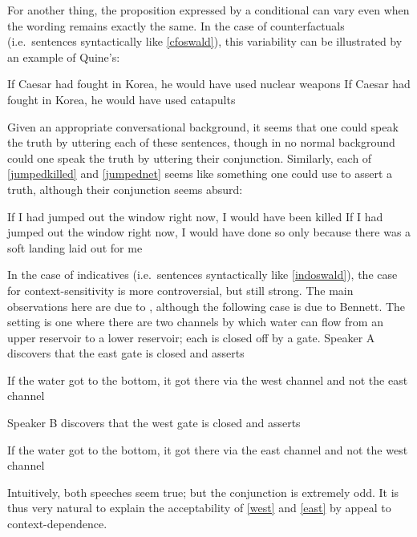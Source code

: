 \documentclass[If.tex]{subfiles}
\begin{document}
For another thing, the proposition expressed by a conditional can vary even when the wording remains exactly the same. In the case of counterfactuals (i.e.~sentences syntactically like \ref{cfoswald}), this variability can be illustrated by an example of Quine's:
\begin{prop}
	\nitem
	\begin{prop}
		\aitem \label{nukes}
			If Caesar had fought in Korea, he would have used nuclear weapons
		\aitem \label{catapults}
			If Caesar had fought in Korea, he would have used catapults
	\end{prop}
\end{prop}
Given an appropriate conversational background, it seems that one could speak the truth by uttering each of these sentences, though in no normal background could one speak the truth by uttering their conjunction. Similarly, each of \ref{jumpedkilled} and \ref{jumpednet} seems like something one could use to assert a truth, although their conjunction seems absurd:
\begin{prop}
	\nitem	
	\begin{prop}
		\aitem \label{jumpedkilled}
		If I had jumped out the window right now, I would have been killed
		\aitem \label{jumpednet}
		If I had jumped out the window right now, I would have done so only because there was a soft landing laid out for me
	\end{prop}
\end{prop}
In the case of indicatives (i.e.~sentences syntactically like \ref{indoswald}), the case for context-sensitivity is more controversial, but still strong. The main observations here are due to \citet{GibbardTRTC}, although the following case is due to Bennett. The setting is one where there are two channels by which water can flow from an upper reservoir to a lower reservoir; each is closed off by a gate. Speaker A discovers that the east gate is closed and asserts
\begin{prop}
	\nitem \label{west}
	If the water got to the bottom, it got there via the west channel and not the east channel
\end{prop}
Speaker B discovers that the west gate is closed and asserts
\begin{prop}
	\nitem \label{east}
	If the water got to the bottom, it got there via the east channel and not the west channel
\end{prop}
Intuitively, both speeches seem true; but the conjunction is extremely odd. It is thus very natural to explain the acceptability of \ref{west} and \ref{east} by appeal to context-dependence.
\end{document}
